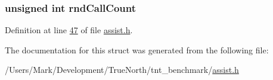 \subsubsection[{rnd\+Call\+Count}]{\setlength{\rightskip}{0pt plus 5cm}unsigned int rnd\+Call\+Count}\label{struct_msg___data_ab4d75bc6367f5cfbfabc69690fdc1efc}


Definition at line \hyperlink{assist_8h_source_l00047}{47} of file \hyperlink{assist_8h_source}{assist.\+h}.



The documentation for this struct was generated from the following file\+:\begin{DoxyCompactItemize}
\item 
/\+Users/\+Mark/\+Development/\+True\+North/tnt\+\_\+benchmark/\hyperlink{assist_8h}{assist.\+h}\end{DoxyCompactItemize}
